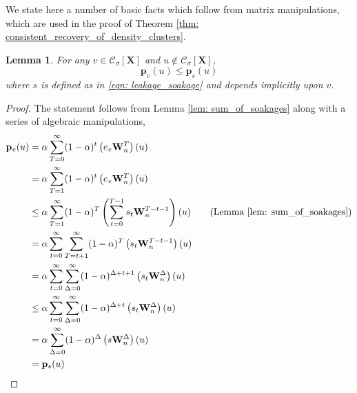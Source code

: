 \documentclass{article}
\newcommand{\1}{\mathbf{1}}
\newcommand{\pbf}{\mathbf{p}}
\newcommand{\Xbf}{\mathbf{X}}
\newcommand{\Wbf}{\mathbf{W}}
\newcommand{\Cset}{\mathcal{C}}
\newcommand{\Csig}{\Cset_{\sigma}}
\theoremstyle{aldenthm}
\newtheorem{lemma}{Lemma}
\begin{document}
We state here a number of basic facts which follow from matrix manipulations, which are used in the proof of Theorem \ref{thm: consistent_recovery_of_density_clusters}. 

\begin{lemma}
	\label{lem: soakage_ppr_lb}
	For any $v \in \Csig[\Xbf]$ and $u \not\in \Csig[\Xbf]$,
	\begin{equation*}
	\pbf_{v}(u) \leq \pbf_{s}(u)
	\end{equation*}
	where $s$ is defined as in \eqref{eqn: leakage_soakage} and depends implicitly upon $v$.
\end{lemma}
\begin{proof}
	The statement follows from Lemma \ref{lem: sum_of_soakages} along with a series of algebraic manipulations,
	\begin{align*}
	\pbf_v(u) & = \alpha\sum_{T = 0}^{\infty} (1 - \alpha)^t \left(e_v \Wbf_n^T\right)(u) \\
	& = \alpha\sum_{T = 1}^{\infty} (1 - \alpha)^t \left(e_v \Wbf_n^T\right)(u) \\
	& \leq \alpha \sum_{T=1}^{\infty} (1 - \alpha)^T \left( \sum_{t = 0}^{T - 1} s_t \Wbf_n^{T - t - 1} \right)(u) \tag{Lemma \ref{lem: sum_of_soakages}}\\
	& = \alpha \sum_{t=0}^{\infty} \sum_{T = t + 1}^{\infty} (1 - \alpha)^T \left( s_t \Wbf_n^{T - t - 1} \right)(u)\\
	& = \alpha \sum_{t=0}^{\infty} \sum_{\Delta = 0}^{\infty} (1 - \alpha)^{\Delta + t + 1} \left( s_t \Wbf_n^{\Delta} \right)(u) \\
	& \leq \alpha \sum_{t=0}^{\infty} \sum_{\Delta = 0}^{\infty} (1 - \alpha)^{\Delta + t } \left( s_t \Wbf_n^{\Delta} \right)(u) \\
	& = \alpha \sum_{\Delta = 0}^{\infty} (1 - \alpha)^{\Delta} \left(s \Wbf_n^{\Delta}\right)(u) \\
	& = \pbf_s(u)
	\end{align*}
\end{proof}
\end{document}
